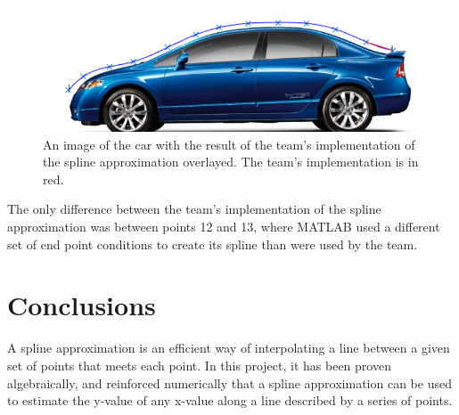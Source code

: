 \documentclass[12pt, letterpaper]{article} %
\begin{document}
\begin{center}
	\begin{figure}[H]
		\includegraphics[scale=0.5]{car_with_both_splines.png}
		\caption{An image of the car with the result of the team's implementation of the spline approximation 		overlayed. The team's implementation is in red.}
	\end{figure}
\end{center}

The only difference between the team's implementation of the spline approximation was between points 12 and 13, where MATLAB used a different set of end point conditions to create its spline than were used by the team.

\section{Conclusions}
A spline approximation is an efficient way of interpolating a line between a given set of points that meets each point. In this project, it has been proven algebraically, and reinforced numerically that a spline approximation can be used to estimate the y-value of any x-value along a line described by a series of points.
\end{document}
